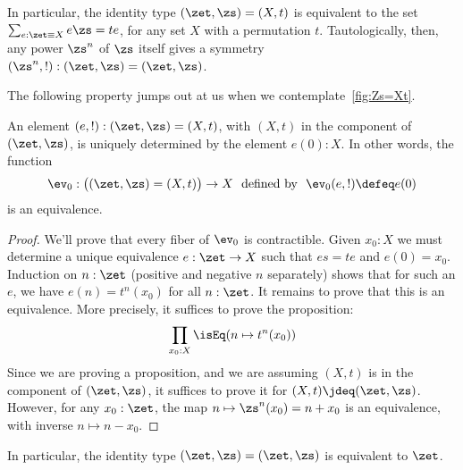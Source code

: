 In particular, the identity type $(\zet,\zs)=(X,t)$
is equivalent to the set $\sum_{e:\zet\equiv X}e\zs=te$, for any set $X$ with a permutation $t$.
Tautologically, then, any power $\zs^n$ of $\zs$ itself gives a symmetry
$(\zs^n,!) : (\zet,\zs)=(\zet,\zs)$.

The following property jumps out at us when we contemplate~\cref{fig:Zs=Xt}.
\begin{lemma}
  \label{lem:IdCisZet}
  An element $(e,!) : (\zet,\zs)=(X,t)$,
  with $(X,t)$ in the component of $(\zet,\zs)$,
  is uniquely determined by the element $e(0):X$.
  In other words, the function
  \[
    \ev_0:\bigl((\zet,\zs)=(X,t)\bigr)\to X
    \text{~~defined by~~} \ev_0(e,!) \defeq e(0)
  \]
  is an equivalence.
\end{lemma}
\begin{proof}
  We'll prove that every fiber of $\ev_0$ is contractible.
  Given $x_0:X$ we must determine a unique equivalence $e:\zet\to X$
  such that $es=te$ and $e(0)=x_0$.
  Induction on $n:\zet$ (positive and negative $n$ separately)
  shows that for such an $e$, we have $e(n) = t^n(x_0)$ for all $n:\zet$.
  It remains to prove that this is an equivalence.
  More precisely, it suffices to prove the proposition:
  \begin{displaymath}
    \prod_{x_0:X} \isEq(n\mapsto t^n(x_0))
  \end{displaymath}
  Since we are proving a proposition,
  and we are assuming $(X,t)$ is in the component of $(\zet,\zs)$,
  it suffices to prove it for $(X,t) \jdeq (\zet,\zs)$.
  However, for any $x_0:\zet$,
  the map $n \mapsto \zs^n(x_0) = n + x_0$ is an equivalence,
  with inverse $n \mapsto n - x_0$.
\end{proof}
In particular, the identity type $(\zet,\zs)=(\zet,\zs)$ is equivalent to $\zet$.

